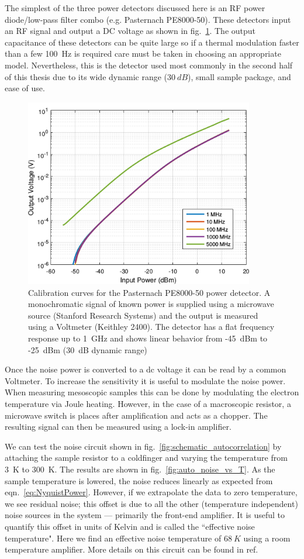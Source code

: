The simplest of the three power detectors discussed here is an RF power diode/low-pass filter combo (e.g. Pasternach PE8000-50). These detectors input an RF signal and output a DC voltage as shown in fig.~\ref{fig:PE8000}. The output capacitance of these detectors can be quite large so if a thermal modulation faster than a few 100~Hz is required care must be taken in choosing an appropriate model. Nevertheless, this is the detector used most commonly in the second half of this thesis due to its wide dynamic range ($30~dB$), small sample package, and ease of use.

\begin{figure}
\centering
\includegraphics[width = 100mm]{figures/Johnson_noise_thermometry/PE8000-50.png}
\caption{Calibration curves for the Pasternach PE8000-50 power detector. A monochromatic signal of known power is supplied using a microwave source (Stanford Research Systems) and the output is measured using a Voltmeter (Keithley 2400). The detector has a flat frequency response up to 1~GHz and shows linear behavior from -45~dBm to -25~dBm (30~dB dynamic range)}
\label{fig:PE8000}
\end{figure}

Once the noise power is converted to a dc voltage it can be read by a common Voltmeter. To increase the sensitivity it is useful to modulate the noise power. When measuring mesoscopic samples this can be done by modulating the electron temperature via Joule heating. However, in the case of a macroscopic resistor, a microwave switch is places after amplification and acts as a chopper. The resulting signal can then be measured using a lock-in amplifier.

We can test the noise circuit shown in fig.~\ref{fig:schematic_autocorrelation} by attaching the sample resistor to a coldfinger and varying the temperature from 3~K to 300~K. The results are shown in fig.~\ref{fig:auto_noise_vs_T}. As the sample temperature is lowered, the noise reduces linearly as expected from eqn.~\ref{eq:NyquistPower}. However, if we extrapolate the data to zero temperature, we see residual noise; this offset is due to all the other (temperature independent) noise sources in the system --- primarily the front-end amplifier. It is useful to quantify this offset in units of Kelvin and is called the ``effective noise temperature". Here we find an effective noise temperature of $68~K$ using a room temperature amplifier.
More details on this circuit can be found in ref.~\cite{crossno_development_2015}

